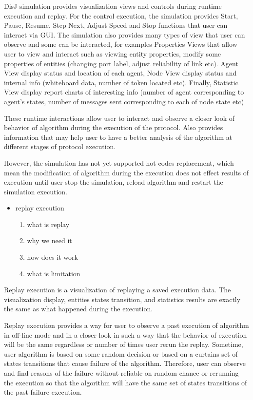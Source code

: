 DisJ simulation provides visualization views and controls during runtime execution and replay. For the control execution, the simulation provides Start, Pause, Resume, Step Next, Adjust Speed and Stop functions that user can interact via GUI. The simulation also provides many types of view that user can observe and some can be interacted, for examples Properties Views that allow user to view and interact such as viewing entity properties, modify some properties of entities (changing port label, adjust reliability of link etc). Agent View display status and location of each agent, Node View display status and internal info (whiteboard data, number of token located etc). Finally, Statistic View display report charts of interesting info (number of agent corresponding to agent's states, number of messages sent corresponding to each of node state etc)

These runtime interactions allow user to interact and observe a closer look of behavior of algorithm during the execution of the protocol. Also provides information that may help user to have a better analysis of the algorithm at different stages of protocol execution.

However, the simulation has not yet supported hot codes replacement, which mean the modification of algorithm during the execution does not effect results of execution until user stop the simulation, reload algorithm and restart the simulation execution.

\begin{itemize}
\item replay execution
    \begin{enumerate}
    \item what is replay
    \item why we need it
    \item how does it work
    \item what is limitation
    \end{enumerate}
\end{itemize}

Replay execution is a visualization of replaying a saved execution data. The visualization display, entities states transition, and statistics results are exactly the same as what happened during the execution.

Replay execution provides a way for user to observe a past execution of algorithm in off-line mode and in a closer look in such a way that the behavior of execution will be the same regardless or number of times user rerun the replay. Sometime, user algorithm is based on some random decision or based on a curtains set of states transitions that cause failure of the algorithm. Therefore, user can observe and find reasons of the failure without reliable on random chance or rerunning the execution so that the algorithm will have the same set of states transitions of the past failure execution.

